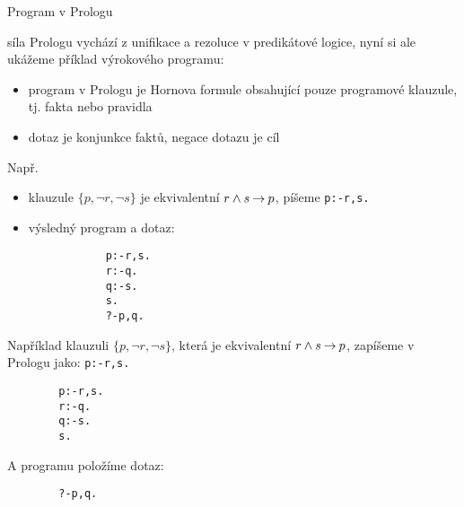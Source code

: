 \documentclass{beamer}
\begin{document}


\begin{frame}[fragile]{Program v Prologu}
    
    síla Prologu vychází z \alert{unifikace} a rezoluce v predikátové logice, nyní si ale ukážeme příklad \alert{výrokového} programu:

    \begin{itemize}
        \item \alert{program} v Prologu je Hornova formule obsahující pouze \alert{programové klauzule}, tj. \alert{fakta} nebo \alert{pravidla}
        \item \alert{dotaz} je konjunkce faktů, negace dotazu je \alert{cíl}
    \end{itemize}
      
    Např. 
    \begin{itemize}
        \item klauzule $\{p,\neg r,\neg s\}$ je ekvivalentní $r\land s\mathbin{\rightarrow} p$, píšeme \texttt{p:-r,s.}
        \item výsledný program a dotaz:
        \begin{verbatim}
            p:-r,s.
            r:-q.
            q:-s.
            s.
            ?-p,q.    
        \end{verbatim}
    \end{itemize}
    
    Například klauzuli $\{p,\neg r,\neg s\}$, která je ekvivalentní $r\land s\mathbin{\rightarrow} p$, zapíšeme v Prologu jako: \texttt{p:-r,s.}
    \begin{verbatim}
        p:-r,s.
        r:-q.
        q:-s.
        s.    
    \end{verbatim}
    A programu položíme dotaz:
    \begin{verbatim}
        ?-p,q.    
    \end{verbatim}

\end{frame}
\end{document}
